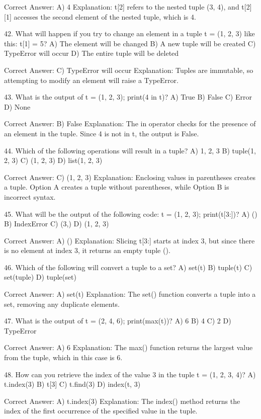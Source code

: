 Correct Answer: A) 4
Explanation: t[2] refers to the nested tuple (3, 4), and t[2][1] accesses the second element of the nested tuple, which is 4.

42. What will happen if you try to change an element in a tuple t = (1, 2, 3) like this: t[1] = 5?
A) The element will be changed
B) A new tuple will be created
C) TypeError will occur
D) The entire tuple will be deleted

Correct Answer: C) TypeError will occur
Explanation: Tuples are immutable, so attempting to modify an element will raise a TypeError.

43. What is the output of t = (1, 2, 3); print(4 in t)?
A) True
B) False
C) Error
D) None

Correct Answer: B) False
Explanation: The in operator checks for the presence of an element in the tuple. Since 4 is not in t, the output is False.

44. Which of the following operations will result in a tuple?
A) 1, 2, 3
B) tuple(1, 2, 3)
C) (1, 2, 3)
D) list(1, 2, 3)

Correct Answer: C) (1, 2, 3)
Explanation: Enclosing values in parentheses creates a tuple. Option A creates a tuple without parentheses, while Option B is incorrect syntax.

45. What will be the output of the following code: t = (1, 2, 3); print(t[3:])?
A) ()
B) IndexError
C) (3,)
D) (1, 2, 3)

Correct Answer: A) ()
Explanation: Slicing t[3:] starts at index 3, but since there is no element at index 3, it returns an empty tuple ().

46. Which of the following will convert a tuple to a set?
A) set(t)
B) tuple(t)
C) set(tuple)
D) tuple(set)

Correct Answer: A) set(t)
Explanation: The set() function converts a tuple into a set, removing any duplicate elements.

47. What is the output of t = (2, 4, 6); print(max(t))?
A) 6
B) 4
C) 2
D) TypeError

Correct Answer: A) 6
Explanation: The max() function returns the largest value from the tuple, which in this case is 6.

48. How can you retrieve the index of the value 3 in the tuple t = (1, 2, 3, 4)?
A) t.index(3)
B) t[3]
C) t.find(3)
D) index(t, 3)

Correct Answer: A) t.index(3)
Explanation: The index() method returns the index of the first occurrence of the specified value in the tuple.

